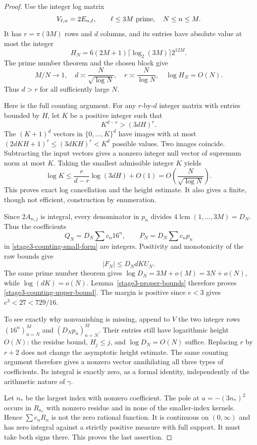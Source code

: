 \documentclass[11pt,a4paper]{article}
\theoremstyle{definition}
\theoremstyle{remark}
\begin{document}
\begin{proof}
Use the integer log matrix
\[
 V_{\ell,n}=2E_{n,\ell},\qquad
 \ell\le3M\hbox{ prime},\quad N\le n\le M.
\]
It has $r=\pi(3M)$ rows and $d$ columns, and its entries have absolute
value at most the integer
\[
 H_N=6(2M+1)\lceil\log_2(3M)\rceil 2^{12M}.
\]
The prime number theorem \cite{dlmf-primes} and the chosen block give
\[
 M/N\to1,\quad d\asymp\frac N{\sqrt{\log N}},\quad
 r\asymp\frac N{\log N},\quad
 \log H_N=O(N).
\]
Thus $d>r$ for all sufficiently large $N$.

Here is the full counting argument. For any $r$-by-$d$ integer matrix
with entries bounded by $H$, let $K$ be a positive integer such that
\[
 K^{d-r}>(3dH)^r.
\]
The $(K+1)^d$ vectors in $\{0,\ldots,K\}^d$ have images with at most
$(2dKH+1)^r\le(3dKH)^r<K^d$ possible values. Two images coincide.
Subtracting the input vectors gives a nonzero integer null vector of
supremum norm at most $K$. Taking the smallest admissible integer $K$
yields
\[
 \log K\le
 \frac r{d-r}\log(3dH)+O(1)
 =O\!\left(\frac N{\sqrt{\log N}}\right).
\]
This proves exact log cancellation and the height estimate. It also
gives a finite, though not efficient, construction by enumeration.

Since $2A_{n,j}$ is integral, every denominator in $p_n$ divides
$4\operatorname{lcm}(1,\ldots,3M)=D_N$. Thus the coefficients
\[
 Q_N=D_N\sum c_n16^n,\qquad P_N=D_N\sum c_np_n
\]
in \eqref{stage3-counting-small-form} are integers. Positivity and
monotonicity of the raw bounds give
\[
 |F_N|\le D_NdK U_N.
\]
The same prime number theorem gives
$\log D_N=3M+o(M)=3N+o(N)$, while
$\log(dK)=o(N)$. Lemma~\ref{stage3-proper-bounds} therefore proves
\eqref{stage3-counting-upper-bound}. The margin is positive since
$e<3$ gives $e^3<27<729/16$.

To see exactly why nonvanishing is missing, append to $V$ the two
integer rows $(16^n)_{n=N}^M$ and $(D_Np_n)_{n=N}^M$.
Their entries still have logarithmic height $O(N)$: the residue bound,
$H_j\le j$, and $\log D_N=O(N)$ suffice. Replacing $r$ by $r+2$
does not change the asymptotic height estimate. The same counting
argument therefore gives a nonzero vector annihilating all three
types of coefficients. Its integral is exactly zero, as a formal
identity, independently of the arithmetic nature of $\gamma$.

Let $n_*$ be the largest index with nonzero coefficient. The pole at
$u=-(3n_*)^2$ occurs in $R_{n_*}$ with nonzero residue and in none of
the smaller-index kernels. Hence $\sum c_nR_n$ is not the zero
rational function. It is continuous on $(0,\infty)$ and has zero
integral against a strictly positive measure with full support.
It must take both signs there. This proves the last assertion.
\end{proof}
\end{document}
